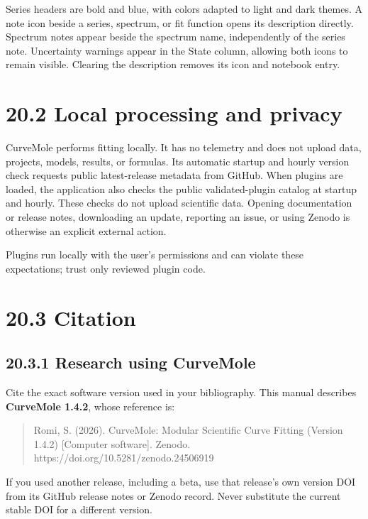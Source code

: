 \documentclass[
  10pt,
  a4paper,
  oneside]{scrreprt}
\begin{document}
Series headers are bold and blue, with colors adapted to light and dark
themes. A note icon beside a series, spectrum, or fit function opens its
description directly. Spectrum notes appear beside the spectrum name,
independently of the series note. Uncertainty warnings appear in the
State column, allowing both icons to remain visible. Clearing the
description removes its icon and notebook entry.

\hypertarget{local-processing-and-privacy}{%
\section{20.2 Local processing and
privacy}\label{local-processing-and-privacy}}

CurveMole performs fitting locally. It has no telemetry and does not
upload data, projects, models, results, or formulas. Its automatic
startup and hourly version check requests public latest-release metadata
from GitHub. When plugins are loaded, the application also checks the
public validated-plugin catalog at startup and hourly. These checks do
not upload scientific data. Opening documentation or release notes,
downloading an update, reporting an issue, or using Zenodo is otherwise
an explicit external action.

Plugins run locally with the user's permissions and can violate these
expectations; trust only reviewed plugin code.

\hypertarget{citation}{%
\section{20.3 Citation}\label{citation}}

\hypertarget{research-using-curvemole}{%
\subsection{20.3.1 Research using
CurveMole}\label{research-using-curvemole}}

Cite the exact software version used in your bibliography. This manual
describes \textbf{CurveMole 1.4.2}, whose reference is:

\begin{quote}
Romi, S. (2026). CurveMole: Modular Scientific Curve Fitting (Version
1.4.2) {[}Computer software{]}. Zenodo.
https://doi.org/10.5281/zenodo.24506919
\end{quote}

If you used another release, including a beta, use that release's own
version DOI from its GitHub release notes or Zenodo record. Never
substitute the current stable DOI for a different version.
\end{document}
